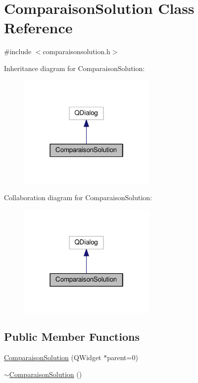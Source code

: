 \hypertarget{classComparaisonSolution}{}\section{Comparaison\+Solution Class Reference}
\label{classComparaisonSolution}


{\ttfamily \#include $<$comparaisonsolution.\+h$>$}



Inheritance diagram for Comparaison\+Solution\+:\nopagebreak
\begin{figure}[H]
\begin{center}
\leavevmode
\includegraphics[width=190pt]{classComparaisonSolution__inherit__graph}
\end{center}
\end{figure}


Collaboration diagram for Comparaison\+Solution\+:\nopagebreak
\begin{figure}[H]
\begin{center}
\leavevmode
\includegraphics[width=190pt]{classComparaisonSolution__coll__graph}
\end{center}
\end{figure}
\subsection*{Public Member Functions}
\begin{DoxyCompactItemize}
\item 
\hyperlink{classComparaisonSolution_a7fc9723f5a627d53e331719c3f47c7cc}{Comparaison\+Solution} (Q\+Widget $\ast$parent=0)
\item 
\hyperlink{classComparaisonSolution_a07a910b473173981273789934cf34e7f}{$\sim$\+Comparaison\+Solution} ()
\end{DoxyCompactItemize}


